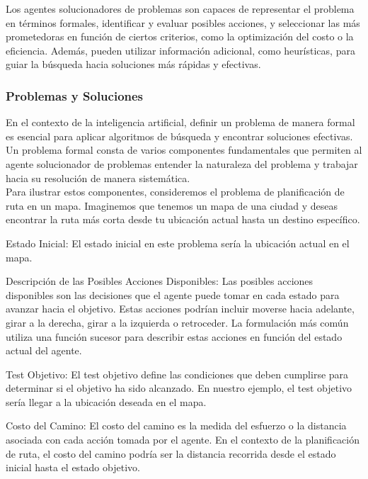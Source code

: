 Los agentes solucionadores de problemas son capaces de representar el problema en términos formales, 
identificar y evaluar posibles acciones, y seleccionar las más prometedoras en función de ciertos 
criterios, como la optimización del costo o la eficiencia. Además, pueden utilizar información adicional, 
como heurísticas, para guiar la búsqueda hacia soluciones más rápidas y efectivas.\\ 

\subsubsection*{Problemas y Soluciones}

En el contexto de la inteligencia artificial, definir un problema de manera formal es esencial para 
aplicar algoritmos de búsqueda y encontrar soluciones efectivas. Un problema formal consta de 
varios componentes fundamentales que permiten al agente solucionador de problemas entender la 
naturaleza del problema y trabajar hacia su resolución de manera sistemática.\\ 

Para ilustrar estos componentes, consideremos el problema de planificación de ruta en un mapa. 
Imaginemos que tenemos un mapa de una ciudad y deseas encontrar la ruta más corta desde tu 
ubicación actual hasta un destino específico.

\begin{myitemize}
    \item Estado Inicial: El estado inicial en este problema sería la ubicación actual en el mapa.
        
    \item Descripción de las Posibles Acciones Disponibles: Las posibles acciones disponibles son las 
    decisiones que el agente puede tomar en cada estado para avanzar hacia el objetivo. Estas acciones 
    podrían incluir moverse hacia adelante, girar a la derecha, girar a la izquierda o retroceder. 
    La formulación más común utiliza una función sucesor para describir estas acciones en función del 
    estado actual del agente.
    
    \item Test Objetivo: El test objetivo define las condiciones que deben cumplirse para determinar si 
    el objetivo ha sido alcanzado. En nuestro ejemplo, el test objetivo sería llegar a la ubicación 
    deseada en el mapa.
    
    \item Costo del Camino: El costo del camino es la medida del esfuerzo o la distancia asociada con 
    cada acción tomada por el agente. En el contexto de la planificación de ruta, el costo del camino 
    podría ser la distancia recorrida desde el estado inicial hasta el estado objetivo.
\end{myitemize}


